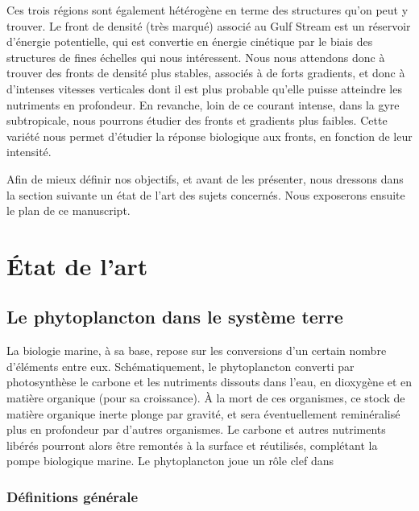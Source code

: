 Ces trois régions sont également hétérogène en terme des structures qu'on peut y trouver.
Le front de densité (très marqué) associé au Gulf Stream est un réservoir d'énergie potentielle, qui est convertie en énergie cinétique par le biais des structures de fines échelles qui nous intéressent.
Nous nous attendons donc à trouver des fronts de densité plus stables, associés à de forts gradients, et donc à d'intenses vitesses verticales dont il est plus probable qu'elle puisse atteindre les nutriments en profondeur.
En revanche, loin de ce courant intense, dans la gyre subtropicale, nous pourrons étudier des fronts et gradients plus faibles.
Cette variété nous permet d'étudier la réponse biologique aux fronts, en fonction de leur intensité.

Afin de mieux définir nos objectifs, et avant de les présenter, nous dressons dans la section suivante un état de l'art des sujets concernés.
Nous exposerons ensuite le plan de ce manuscript.

\section{État de l'art}
\label{sec:etat-de-lart}

\subsection{Le phytoplancton dans le système terre}
\label{sec:phyto-ds-sys-terre}

La biologie marine, à sa base, repose sur les conversions d'un certain nombre d'éléments entre eux.
Schématiquement, le phytoplancton converti par photosynthèse le carbone et les nutriments dissouts dans l'eau, en dioxygène et en matière organique (pour sa croissance).
À la mort de ces organismes, ce stock de matière organique inerte plonge par gravité, et sera éventuellement reminéralisé plus en profondeur par d'autres organismes.
Le carbone et autres nutriments libérés pourront alors être remontés à la surface et réutilisés, complétant la pompe biologique marine.
Le phytoplancton joue un rôle clef dans


\subsubsection{Définitions générale}
\label{sec:phyto-def-gen}

